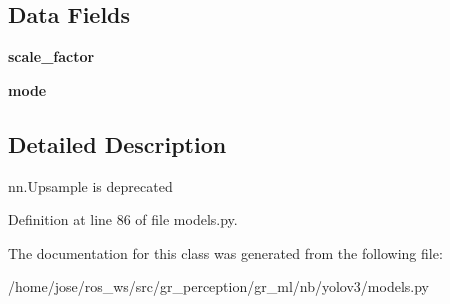 \subsection*{Data Fields}
\begin{DoxyCompactItemize}
\item 
\mbox{\label{classmodels_1_1Upsample_a1fcac424f6eaa779f09d4ab19eeb954d}} 
{\bfseries scale\+\_\+factor}
\item 
\mbox{\label{classmodels_1_1Upsample_adb0c15e373c9589619fa40f0bd4160f9}} 
{\bfseries mode}
\end{DoxyCompactItemize}


\subsection{Detailed Description}
\begin{DoxyVerb}nn.Upsample is deprecated \end{DoxyVerb}
 

Definition at line 86 of file models.\+py.



The documentation for this class was generated from the following file\+:\begin{DoxyCompactItemize}
\item 
/home/jose/ros\+\_\+ws/src/gr\+\_\+perception/gr\+\_\+ml/nb/yolov3/models.\+py\end{DoxyCompactItemize}
